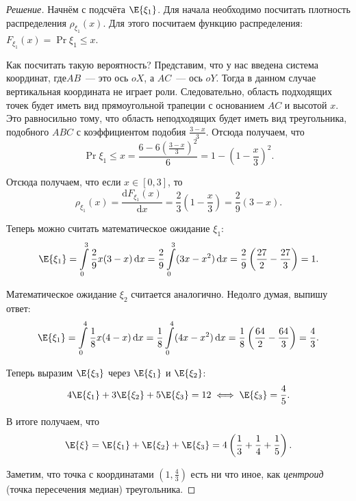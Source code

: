 \begin{proof}[Решение]
{	Начнём с подсчёта \(\E{\xi_1}\). Для начала необходимо посчитать плотность распределения \(\rho_{\xi_1}(x)\). Для этого посчитаем функцию распределения: \(F_{\xi_1}(x) = \Pr{\xi_1 \leq x}\).
	\par}%
	
	Как посчитать такую вероятность? Представим, что у нас введена система координат, где\(AB\)~--- это ось \(oX\), а \(AC\)~--- ось \(oY\). Тогда в данном случае вертикальная координата не играет роли. Следовательно, область подходящих точек будет иметь вид прямоугольной трапеции с основанием \(AC\) и высотой \(x\). Это равносильно тому, что область неподходящих будет иметь вид треугольника, подобного \(ABC\) с коэффициентом подобия \(\frac{3 - x}{3}\). Отсюда получаем, что
	\[\Pr{\xi_1 \leq x} = \frac{6 - 6\left(\frac{3 - x}{3}\right)^2}{6} = 1 - \left(1 - \frac{x}{3}\right)^2.\]
	
	Отсюда получаем, что если \(x \in [0, 3]\), то
	\[\rho_{\xi_1}(x) = \frac{\mathrm{d}F_{\xi_1}(x)}{\mathrm{d}x} = \frac{2}{3}\left(1 - \frac{x}{3}\right) = \frac{2}{9}(3 - x).\]
	
	Теперь можно считать математическое ожидание \(\xi_1\):
	\[\E{\xi_1} = \int\limits_{0}^{3} \frac{2}{9}x(3 - x)\,\mathrm{d}x = \frac{2}{9} \int\limits_{0}^{3} (3x - x^2)\,\mathrm{d}x = \frac{2}{9}\left(\frac{27}{2} - \frac{27}{3}\right) = 1.\]
	
	Математическое ожидание \(\xi_2\) считается аналогично. Недолго думая, выпишу ответ:
	\[\E{\xi_1} = \int\limits_{0}^{4} \frac{1}{8}x(4 - x)\,\mathrm{d}x = \frac{1}{8} \int\limits_{0}^{4} (4x - x^2)\,\mathrm{d}x = \frac{1}{8}\left(\frac{64}{2} - \frac{64}{3}\right) = \frac{4}{3}.\]
	
	Теперь выразим \(\E{\xi_3}\) через \(\E{\xi_1}\) и \(\E{\xi_2}\):
	\[4\E{\xi_1} + 3\E{\xi_2} + 5\E{\xi_3} = 12 \iff \E{\xi_3} = \frac{4}{5}.\]
	
	В итоге получаем, что \[\E{\xi} = \E{\xi_1} + \E{\xi_2} + \E{\xi_3} = 4\left(\frac{1}{3} + \frac{1}{4} + \frac{1}{5}\right).\]
	
	Заметим, что точка с координатами \(\left(1, \frac{4}{3}\right)\) есть ни что иное, как \emph{центроид} (точка пересечения медиан) треугольника.
\end{proof}

